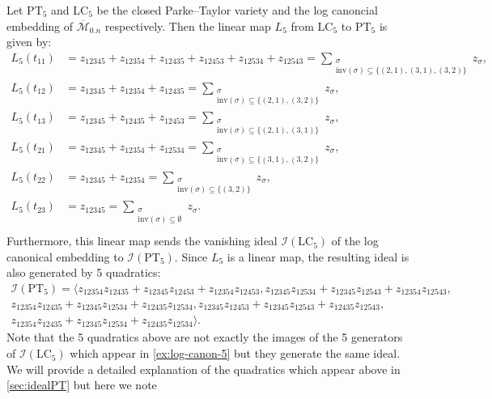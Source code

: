 \documentclass[12pt, reqno]{amsart}
\numberwithin{equation}{section}
\theoremstyle{plain}
\theoremstyle{definition}
\newenvironment{example}
  {\pushQED{\qed}\renewcommand{\qedsymbol}{$\triangle$}\examplex}
  {\popQED\endexamplex}
\newcommand{\ci}{\mathcal{I}}
\newcommand{\pt}{\mathrm{PT}}
\newcommand{\lc}{\mathrm{LC}}
\newcommand{\inv}{\mathrm{inv}}
\begin{document}
\begin{example}
\label{ex:LC-to-PT-5}
Let $\pt_5$ and $\lc_5$ be the closed Parke--Taylor variety and the log canoncial embedding of $\overline{\mathcal{M}}_{0.n}$ respectively. Then the linear map $L_5$ from $\lc_5$ to $\pt_5$ is given by:
\begin{align*}
L_5(t_{11}) &= z_{12345} + z_{12354} + z_{12435} + z_{12453} + z_{12534} + z_{12543} = \sum_{\substack{\sigma \\ \inv(\sigma) \subseteq \{(2,1), (3,1), (3,2)\}}} z_\sigma,\\
L_5(t_{12}) &= z_{12345} + z_{12354} + z_{12435}  = \sum_{\substack{\sigma \\ \inv(\sigma) \subseteq \{(2,1), (3,2)\}}} z_\sigma,\\
L_5(t_{13}) &= z_{12345} + z_{12435} + z_{12453} = \sum_{\substack{\sigma \\ \inv(\sigma) \subseteq \{(2,1), (3,1) \}}} z_\sigma, \\ 
L_5(t_{21}) &= z_{12345} + z_{12354} + z_{12534} = \sum_{\substack{\sigma \\ \inv(\sigma) \subseteq \{(3,1), (3,2)\}}} z_\sigma,\\
L_5(t_{22}) &= z_{12345} + z_{12354} = \sum_{\substack{\sigma \\ \inv(\sigma) \subseteq \{(3,2)\}}} z_\sigma,\\
L_5(t_{23}) &= z_{12345} = \sum_{\substack{\sigma \\ \inv(\sigma) \subseteq \emptyset}} z_\sigma.\\
\end{align*}
Furthermore, this linear map sends the vanishing ideal $\ci(\lc_5)$ of the log canonical embedding to $\ci(\pt_5)$. Since $L_5$ is a linear map, the resulting ideal is also generated by 5 quadratics:
\begin{align*}
\ci(\pt_5) = 
\langle 
z_{12354}z_{12435}+z_{12345}z_{12453}+z_{12354}z_{12453}, z_{12345}z_{12534}+z_{12345}z_{12543}+z_{12354}z_{12543},\\
z_{12354}z_{12435}+z_{12345}z_{12534}+z_{12435}z_{12534}, z_{12345}z_{12453}+z_{12345}z_{12543}+z_{12435}z_{12543},\\
z_{12354}z_{12435}+z_{12345}z_{12534}+z_{12435}z_{12534} 
\rangle.
\end{align*}
Note that the 5 quadratics above are not exactly the images of the 5 generators of $\ci(\lc_5)$ which appear in \cref{ex:log-canon-5} but they generate the same ideal. We will provide a detailed explanation of the quadratics which appear above in \cref{sec:idealPT} but here we note

\end{example}
\end{document}
